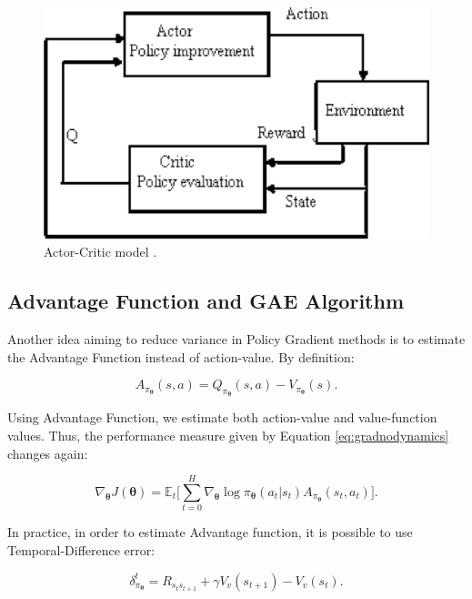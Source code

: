\begin{figure}[!htpb]
	\centering
	\includegraphics[scale=0.5]{Cap4/actorcritic.eps}
	\caption{Actor-Critic model \cite{actorcritic}.}
	\label{fig:actorcritic}
\end{figure}

\subsection{Advantage Function and GAE Algorithm} \label{sec:gae}

Another idea aiming to reduce variance in Policy Gradient methods is to estimate the Advantage Function instead of action-value. By definition:

\begin{equation}
A_{\pi_{\boldsymbol{\theta}}}(s,a) =Q_{\pi_{\boldsymbol{\theta}}}(s,a) - V_{\pi_{\boldsymbol{\theta}}}(s).
\end{equation}

Using Advantage Function, we estimate both action-value and value-function values. Thus, the performance measure given by Equation \ref{eq:gradnodynamics} changes again:

\begin{equation}\label{eq:advgradient}
\nabla_{\boldsymbol{\theta}} J(\boldsymbol{\theta}) = \mathbb{E}_{t} \Bigg[ \sum_{t=0}^{H} \nabla_{\boldsymbol{\theta}} \log \pi_{\boldsymbol{\theta}} (a_{t}|s_{t}) A_{\pi_{\boldsymbol{\theta}}}(s_{t},a_{t}) \Bigg].
\end{equation}

In practice, in order to estimate Advantage function, it is possible to use Temporal-Difference error:

\begin{equation}
\delta^{t}_{\pi_{\boldsymbol{\theta}}} = R_{s_{t}s_{t+1}} + \gamma V_v(s_{t+1}) - V_v(s_{t}). \label{eq:tderror}
\end{equation}

